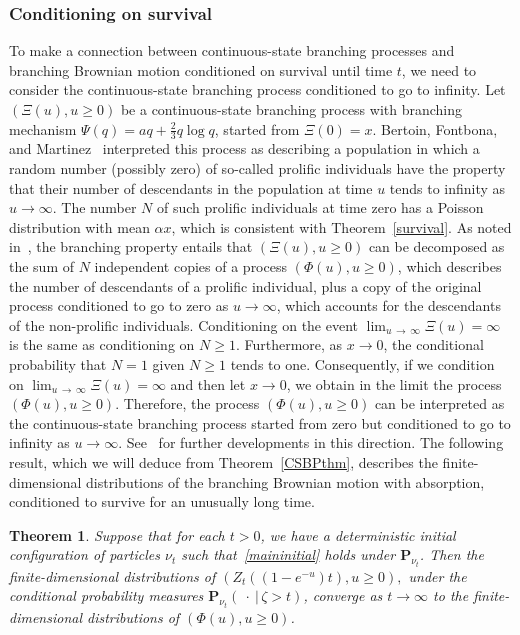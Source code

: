 \documentclass[10pt]{amsart}
\newtheorem{theo}{Theorem}[section]
\theoremstyle{definition}\newtheorem{defi}[theo]{Definition}\newtheorem{rema}[theo]{Remark}\newtheorem{exam}[theo]{Example}\newtheorem{exem}[theo]{Example}\newtheorem{nota}[theo]{Notation}
\renewcommand*\P{\mathbf{P}}
\newcommand{\1} {\mathds{1}}
\begin{document}
\subsubsection{Conditioning on survival}
To make a connection between continuous-state branching processes and branching Brownian motion conditioned on survival until time $t$, we need to consider the continuous-state branching process conditioned to go to infinity. Let $(\Xi(u), u \geq 0)$ be a continuous-state branching process with branching mechanism $\Psi(q) = aq + \frac{2}{3} q \log q$, started from $\Xi(0) = x$. Bertoin, Fontbona, and Martinez~\cite{bfm08} interpreted this process as describing a population in which a random number (possibly zero) of so-called prolific individuals have the property that their number of descendants in the population at time $u$ tends to infinity as $u \rightarrow \infty$. The number $N$ of such prolific individuals at time zero has a Poisson distribution with mean $\alpha x$, which is consistent with Theorem~\ref{survival}. As noted in~\cite[Section~3]{bfm08}, the branching property entails that $(\Xi(u), u \geq 0)$ can be decomposed as the sum of $N$ independent copies of a process $(\Phi(u), u \geq 0)$, which describes the number of descendants of a prolific individual, plus a copy of the original process conditioned to go to zero as $u \rightarrow \infty$, which accounts for the descendants of the non-prolific individuals. Conditioning on the event $\lim_{u\,\rightarrow\,\infty} \Xi(u) = \infty$ is the same as conditioning on $N \geq 1$. Furthermore, as $x \rightarrow 0$, the conditional probability that $N = 1$ given $N \geq 1$ tends to one. Consequently, if we condition on $\lim_{u\,\rightarrow\,\infty} \Xi(u) = \infty$ and then let $x \rightarrow 0$, we obtain in the limit the process $(\Phi(u), u \geq 0)$. Therefore, the process $(\Phi(u), u \geq 0)$ can be interpreted as the continuous-state branching process started from zero but conditioned to go to infinity as $u \rightarrow \infty$. See~\cite{bkm11, fm19} for further developments in this direction. The following result, which we will deduce from Theorem~\ref{CSBPthm}, describes the finite-dimensional distributions of the branching Brownian motion with absorption, conditioned to survive for an unusually long time.

\begin{theo}\label{CSBPcond}
Suppose that for each $t > 0$, we have a deterministic initial configuration of particles $\nu_t$ such that~\eqref{maininitial} holds under $\P_{\nu_t}$. Then the finite-dimensional distributions of $(Z_t((1 - e^{-u})t), u \geq 0),$ under the conditional probability measures $\P_{\nu_t}(\:\cdot\:|\,\zeta > t)$, converge as $t \rightarrow \infty$ to the finite-dimensional distributions of $(\Phi(u), u \geq 0)$.
\end{theo}
\end{document}
